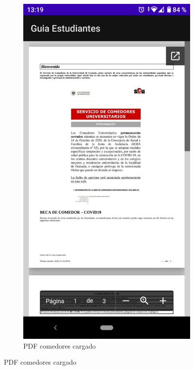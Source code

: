 \documentclass[a4paper,11pt]{article}
\begin{document}
\begin{figure}[H]
\begin{subfigure}{0.5\textwidth}
  \label{fig:sub-first}
\end{subfigure}
\begin{subfigure}{0.5\textwidth}
  \centering
  \includegraphics[width=1\linewidth]{imagenes/comedores.jpeg}  
  \caption{PDF comedores cargado}
  \label{fig:sub-second}
\end{subfigure}
\end{figure}
\end{document}
